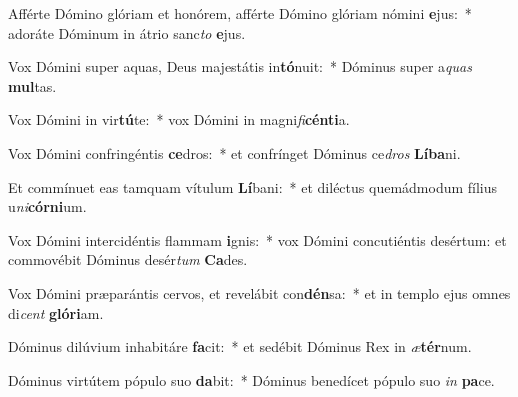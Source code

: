 \item Afférte Dómino glóriam et honórem, afférte Dómino glóriam nómini \textbf{e}jus:~* adoráte Dóminum in átrio sanc\textit{to} \textbf{e}jus.
\item Vox Dómini super aquas, Deus majestátis in\textbf{tó}nuit:~* Dóminus super a\textit{quas} \textbf{mul}tas.
\item Vox Dómini in vir\textbf{tú}te:~* vox Dómini in magni\textit{fi}\textbf{cén}\textbf{ti}a.
\item Vox Dómini confringéntis \textbf{ce}dros:~* et confrínget Dóminus ce\textit{dros} \textbf{Lí}\textbf{ba}ni.
\item Et commínuet eas tamquam vítulum \textbf{Lí}bani:~* et diléctus quemádmodum fílius u\textit{ni}\textbf{cór}\textbf{ni}um.
\item Vox Dómini intercidéntis flammam \textbf{i}gnis:~* vox Dómini concutiéntis desértum: et commovébit Dóminus desér\textit{tum} \textbf{Ca}des.
\item Vox Dómini præparántis cervos, et revelábit con\textbf{dén}sa:~* et in templo ejus omnes di\textit{cent} \textbf{gló}\textbf{ri}am.
\item Dóminus dilúvium inhabitáre \textbf{fa}cit:~* et sedébit Dóminus Rex in \textit{æ}\textbf{tér}num.
\item Dóminus virtútem pópulo suo \textbf{da}bit:~* Dóminus benedícet pópulo suo \textit{in} \textbf{pa}ce.
